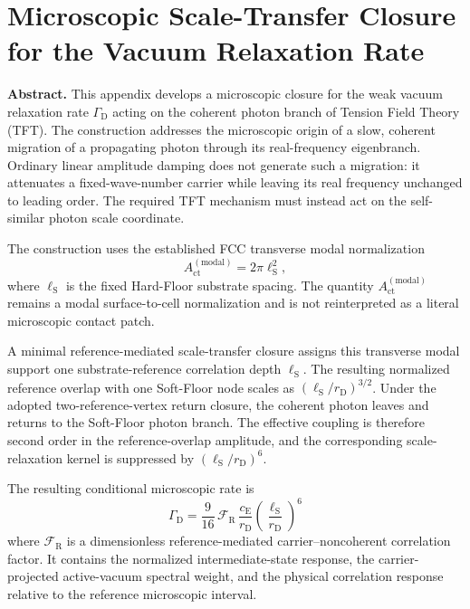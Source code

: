 \chapter{Microscopic Scale-Transfer Closure for the Vacuum Relaxation Rate}
\label{app:vacuumdamping_cosmicredshift}

\noindent\textbf{Abstract.}
This appendix develops a microscopic closure for the weak vacuum relaxation
rate $\Gamma_{\mathrm D}$ acting on the coherent photon branch of Tension
Field Theory (TFT). The construction addresses the microscopic origin of a
slow, coherent migration of a propagating photon through its real-frequency
eigenbranch. Ordinary linear amplitude damping does not generate such a
migration: it attenuates a fixed-wave-number carrier while leaving its real
frequency unchanged to leading order. The required TFT mechanism must instead
act on the self-similar photon scale coordinate.

The construction uses the established FCC transverse modal normalization
\begin{equation}
    A_{\mathrm{ct}}^{(\mathrm{modal})}
    =
    2\pi\ell_{\mathrm S}^{2},
\end{equation}
where $\ell_{\mathrm S}$ is the fixed Hard-Floor substrate spacing.
The quantity $A_{\mathrm{ct}}^{(\mathrm{modal})}$ remains a modal
surface-to-cell normalization and is not reinterpreted as a literal
microscopic contact patch.

A minimal reference-mediated scale-transfer closure assigns this transverse
modal support one substrate-reference correlation depth $\ell_{\mathrm S}$.
The resulting normalized reference overlap with one Soft-Floor node scales as
$(\ell_{\mathrm S}/r_{\mathrm D})^{3/2}$. Under the adopted
two-reference-vertex return closure, the coherent photon leaves and returns to
the Soft-Floor photon branch. The effective coupling is therefore second order
in the reference-overlap amplitude, and the corresponding scale-relaxation
kernel is suppressed by $(\ell_{\mathrm S}/r_{\mathrm D})^6$.

The resulting conditional microscopic rate is
\begin{equation}
    \boxed{
    \Gamma_{\mathrm D}
    =
    \frac{9}{16}\,
    \mathcal F_{\mathrm R}\,
    \frac{c_{\mathrm E}}{r_{\mathrm D}}
    \left(
        \frac{\ell_{\mathrm S}}{r_{\mathrm D}}
    \right)^6
    }
    \label{eq:AQ_gamma_master}
\end{equation}
where $\mathcal F_{\mathrm R}$ is a dimensionless
reference-mediated carrier--noncoherent correlation factor. It contains the
normalized intermediate-state response, the carrier-projected active-vacuum
spectral weight, and the physical correlation response relative to the
reference microscopic interval.

